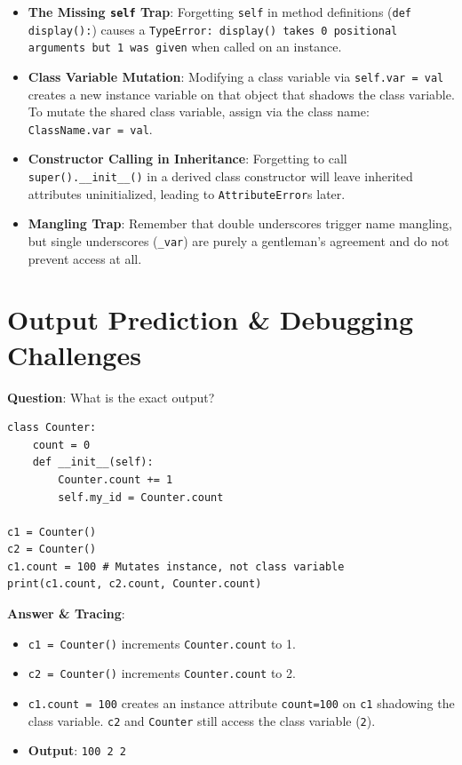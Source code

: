 \begin{examtip}
\begin{itemize}[leftmargin=1.5em]
    \item \textbf{The Missing \texttt{self} Trap}: Forgetting \texttt{self} in method definitions (\texttt{def display():}) causes a \texttt{TypeError: display() takes 0 positional arguments but 1 was given} when called on an instance.
    \item \textbf{Class Variable Mutation}: Modifying a class variable via \texttt{self.var = val} creates a new instance variable on that object that shadows the class variable. To mutate the shared class variable, assign via the class name: \texttt{ClassName.var = val}.
    \item \textbf{Constructor Calling in Inheritance}: Forgetting to call \texttt{super().\_\_init\_\_()} in a derived class constructor will leave inherited attributes uninitialized, leading to \texttt{AttributeError}s later.
    \item \textbf{Mangling Trap}: Remember that double underscores trigger name mangling, but single underscores (\texttt{\_var}) are purely a gentleman's agreement and do not prevent access at all.
\end{itemize}
\end{examtip}

\section{Output Prediction \& Debugging Challenges}

\begin{outputprediction}
\textbf{Question}: What is the exact output?
\begin{lstlisting}[language=Python3]
class Counter:
    count = 0
    def __init__(self):
        Counter.count += 1
        self.my_id = Counter.count

c1 = Counter()
c2 = Counter()
c1.count = 100 # Mutates instance, not class variable
print(c1.count, c2.count, Counter.count)
\end{lstlisting}
\textbf{Answer \& Tracing}:
\begin{itemize}
    \item \texttt{c1 = Counter()} increments \texttt{Counter.count} to 1.
    \item \texttt{c2 = Counter()} increments \texttt{Counter.count} to 2.
    \item \texttt{c1.count = 100} creates an instance attribute \texttt{count=100} on \texttt{c1} shadowing the class variable. \texttt{c2} and \texttt{Counter} still access the class variable (\texttt{2}).
    \item \textbf{Output}: \texttt{100 2 2}
\end{itemize}
\end{outputprediction}

